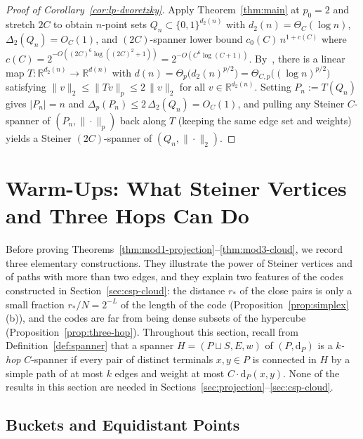 \documentclass[11pt]{article}
\theoremstyle{definition}
\theoremstyle{remark}
\newcommand{\R}{\mathbb{R}}
\newcommand{\dP}{\mathrm{d}_P}
\begin{document}
\begin{proof}[Proof of Corollary~\ref{cor:lp-dvoretzky}]
Apply Theorem~\ref{thm:main} at $p_0 = 2$ and stretch $2 C$ to obtain $n$-point sets $Q_n \subset \{0, 1\}^{d_2(n)}$ with $d_2(n) = \Theta_C(\log n)$, $\Delta_2(Q_n) = O_C(1)$, and $(2C)$-spanner lower bound $c_0(C)\,n^{1 + c(C)}$ where $c(C) = 2^{-O((2C)^6 \log((2C)^2 + 1))} = 2^{-O(C^6 \log(C + 1))}$. By~\cite[Example~3.1]{figiel1977dimension}, there is a linear map $T : \R^{d_2(n)} \to \R^{d(n)}$ with $d(n) = \Theta_p\bigl(d_2(n)^{p/2}\bigr) = \Theta_{C, p}\bigl((\log n)^{p/2}\bigr)$ satisfying $\|v\|_2 \le \|T v\|_p \le 2\,\|v\|_2$ for all $v \in \R^{d_2(n)}$. Setting $P_n := T(Q_n)$ gives $|P_n| = n$ and $\Delta_p(P_n) \le 2\,\Delta_2(Q_n) = O_C(1)$, and pulling any Steiner $C$-spanner of $(P_n, \|\cdot\|_p)$ back along $T$ (keeping the same edge set and weights) yields a Steiner $(2C)$-spanner of $(Q_n, \|\cdot\|_2)$.
\end{proof}


\section{Warm-Ups: What Steiner Vertices and Three Hops Can Do}
\label{sec:warmups}

Before proving Theorems~\ref{thm:mod1-projection}--\ref{thm:mod3-cloud}, we record three elementary constructions. They illustrate the power of Steiner vertices and of paths with more than two edges, and they explain two features of the codes constructed in Section~\ref{sec:csp-cloud}: the distance $r_*$ of the close pairs is only a small fraction $r_*/N = 2^{-L}$ of the length of the code (Proposition~\ref{prop:simplex}(b)), and the codes are far from being dense subsets of the hypercube (Proposition~\ref{prop:three-hop}). Throughout this section, recall from Definition~\ref{def:spanner} that a spanner $H = (P \sqcup S, E, w)$ of $(P, \dP)$ is a \emph{$k$-hop} $C$-spanner if every pair of distinct terminals $x, y \in P$ is connected in $H$ by a simple path of at most $k$ edges and weight at most $C \cdot \dP(x, y)$. None of the results in this section are needed in Sections~\ref{sec:projection}--\ref{sec:csp-cloud}.

\subsection{Buckets and Equidistant Points}
\label{subsec:bucketing-simplex}
\end{document}

